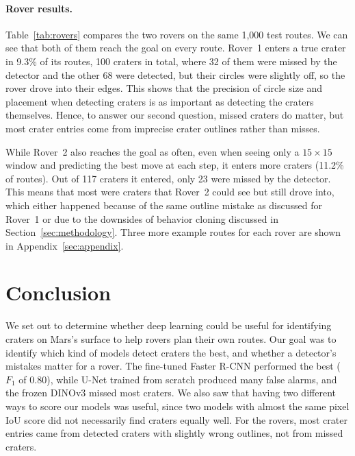 \documentclass{article} %
\begin{document}
\paragraph{Rover results.}
Table~\ref{tab:rovers} compares the two rovers on the same 1,000 test routes. We can see that both of them reach the goal on every route. Rover~1 enters a true crater in 9.3\% of its routes, 100 craters in total, where 32 of them were missed by the detector and the other 68 were detected, but their circles were slightly off, so the rover drove into their edges. This shows that the precision of circle size and placement when detecting craters is as important as detecting the craters themselves. Hence, to answer our second question, missed craters do matter, but most crater entries come from imprecise crater outlines rather than misses.

While Rover~2 also reaches the goal as often, even when seeing only a $15 \times 15$ window and predicting the best move at each step, it enters more craters (11.2\% of routes). Out of 117 craters it entered, only 23 were missed by the detector. This means that most were craters that Rover~2 could see but still drove into, which either happened because of the same outline mistake as discussed for Rover~1 or due to the downsides of behavior cloning discussed in Section~\ref{sec:methodology}. Three more example routes for each rover are shown in Appendix~\ref{sec:appendix}.








\vspace{-10pt}
\section{Conclusion}
\label{sec:conclusion}

We set out to determine whether deep learning could be useful for identifying craters on Mars's surface to help rovers plan their own routes. Our goal was to identify which kind of models detect craters the best, and whether a detector's mistakes matter for a rover. The fine-tuned Faster R-CNN performed the best ($F_1$ of 0.80), while U-Net trained from scratch produced many false alarms, and the frozen DINOv3 missed most craters. We also saw that having two different ways to score our models was useful, since two models with almost the same pixel IoU score did not necessarily find craters equally well. For the rovers, most crater entries came from detected craters with slightly wrong outlines, not from missed craters.
\end{document}
